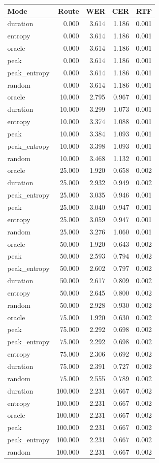 \begin{tabular}{lrrrr}
\toprule
Mode & Route & WER & CER & RTF \\
\midrule
duration & 0.000 & 3.614 & 1.186 & 0.001 \\
entropy & 0.000 & 3.614 & 1.186 & 0.001 \\
oracle & 0.000 & 3.614 & 1.186 & 0.001 \\
peak & 0.000 & 3.614 & 1.186 & 0.001 \\
peak_entropy & 0.000 & 3.614 & 1.186 & 0.001 \\
random & 0.000 & 3.614 & 1.186 & 0.001 \\
oracle & 10.000 & 2.795 & 0.967 & 0.001 \\
duration & 10.000 & 3.299 & 1.073 & 0.001 \\
entropy & 10.000 & 3.374 & 1.088 & 0.001 \\
peak & 10.000 & 3.384 & 1.093 & 0.001 \\
peak_entropy & 10.000 & 3.398 & 1.093 & 0.001 \\
random & 10.000 & 3.468 & 1.132 & 0.001 \\
oracle & 25.000 & 1.920 & 0.658 & 0.002 \\
duration & 25.000 & 2.932 & 0.949 & 0.002 \\
peak_entropy & 25.000 & 3.035 & 0.946 & 0.001 \\
peak & 25.000 & 3.040 & 0.947 & 0.001 \\
entropy & 25.000 & 3.059 & 0.947 & 0.001 \\
random & 25.000 & 3.276 & 1.060 & 0.001 \\
oracle & 50.000 & 1.920 & 0.643 & 0.002 \\
peak & 50.000 & 2.593 & 0.794 & 0.002 \\
peak_entropy & 50.000 & 2.602 & 0.797 & 0.002 \\
duration & 50.000 & 2.617 & 0.809 & 0.002 \\
entropy & 50.000 & 2.645 & 0.800 & 0.002 \\
random & 50.000 & 2.928 & 0.930 & 0.002 \\
oracle & 75.000 & 1.920 & 0.630 & 0.002 \\
peak & 75.000 & 2.292 & 0.698 & 0.002 \\
peak_entropy & 75.000 & 2.292 & 0.698 & 0.002 \\
entropy & 75.000 & 2.306 & 0.692 & 0.002 \\
duration & 75.000 & 2.391 & 0.727 & 0.002 \\
random & 75.000 & 2.555 & 0.789 & 0.002 \\
duration & 100.000 & 2.231 & 0.667 & 0.002 \\
entropy & 100.000 & 2.231 & 0.667 & 0.002 \\
oracle & 100.000 & 2.231 & 0.667 & 0.002 \\
peak & 100.000 & 2.231 & 0.667 & 0.002 \\
peak_entropy & 100.000 & 2.231 & 0.667 & 0.002 \\
random & 100.000 & 2.231 & 0.667 & 0.002 \\
\bottomrule
\end{tabular}
